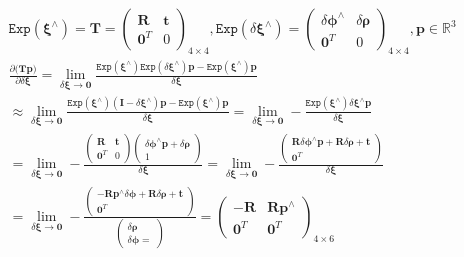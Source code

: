 \documentclass{article}
\begin{document}
\begin{CJK*}{GBK}{song}
\begin{equation}\left.\begin{aligned}
&
\mathtt{Exp}(\boldsymbol{\xi^{\wedge}})
=\textbf{T}=
\begin{pmatrix}
\textbf{R}&\textbf{t}\\\textbf{0}^T&0
\end{pmatrix}_{4\times4},
\mathtt{Exp}(\delta\boldsymbol{\xi^{\wedge}})
=\begin{pmatrix}
\delta\boldsymbol{\phi}^{\wedge}&\delta\boldsymbol{\rho}\\\textbf{0}^T&0
\end{pmatrix}_{4\times4},\textbf{p}\in{\mathbb{R}^3}
\\&
\frac{\partial{(\textbf{T}\textbf{p}})}{\partial{\delta\boldsymbol{\xi}}}
={\lim_{\delta\boldsymbol{\xi} \to \textbf{0}}}
\frac{\mathtt{Exp}(\boldsymbol{\xi^{\wedge}})\mathtt{Exp}(\delta\boldsymbol{\xi^{\wedge}})\textbf{p}
-\mathtt{Exp}(\boldsymbol{\xi^{\wedge}})\textbf{p}
}{\delta\boldsymbol{\xi}}
\\&
\approx{\lim_{\delta\boldsymbol{\xi} \to \textbf{0}}}
\frac{\mathtt{Exp}(\boldsymbol{\xi^{\wedge}})(\textbf{I}-\delta\boldsymbol{\xi^{\wedge}})\textbf{p}
-\mathtt{Exp}(\boldsymbol{\xi^{\wedge}})\textbf{p}
}{\delta\boldsymbol{\xi}}
={\lim_{\delta\boldsymbol{\xi} \to \textbf{0}}}
-\frac{\mathtt{Exp}(\boldsymbol{\xi^{\wedge}})\delta\boldsymbol{\xi^{\wedge}}\textbf{p}
}{\delta\boldsymbol{\xi}}
\\&
={\lim_{\delta\boldsymbol{\xi} \to \textbf{0}}}
-\frac{
\begin{pmatrix}
\textbf{R}&\textbf{t}\\\textbf{0}^T&0
\end{pmatrix}
\begin{pmatrix}
\delta\boldsymbol{\phi}^{\wedge}\textbf{p}+\delta\boldsymbol{\rho}
\\
1
\end{pmatrix}
}{\delta\boldsymbol{\xi}}
={\lim_{\delta\boldsymbol{\xi} \to \textbf{0}}}
-\frac{
\begin{pmatrix}
\textbf{R}\delta\boldsymbol{\phi}^{\wedge}\textbf{p}+\textbf{R}\delta\boldsymbol{\rho}+\textbf{t}\\\textbf{0}^T
\end{pmatrix}
}{\delta\boldsymbol{\xi}}
\\&
={\lim_{\delta\boldsymbol{\xi} \to \textbf{0}}}
-\frac{
\begin{pmatrix}
-\textbf{R}\textbf{p}^{\wedge}\delta\boldsymbol{\phi}+\textbf{R}\delta\boldsymbol{\rho}+\textbf{t}\\\textbf{0}^T
\end{pmatrix}
}{\begin{pmatrix}
\delta\boldsymbol{\rho}
\\\delta\boldsymbol{\phi}=
\end{pmatrix}
}
=\begin{pmatrix}
-\textbf{R}&\textbf{R}\textbf{p}^{\wedge}\\\textbf{0}^T&\textbf{0}^T
\end{pmatrix}_{4\times6}
\end{aligned}\right.
\tag{1.1}
\end{equation}


\end{CJK*}
\end{document}

